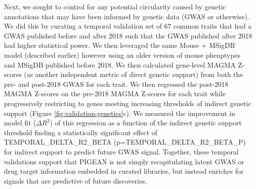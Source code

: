 Next, we sought to control for any potential circularity caused by genetic annotations that may have been informed by genetic data (GWAS or otherwise). We did this by curating a temporal validation set of 67 common traits that had a GWAS published before and after 2018 such that the GWAS published after 2018 had higher statistical power. We then leveraged the same Mouse + MSigDB model (described earlier) however using an older version of mouse phenptypes and MSigDB published before 2018. We then calculated gene-level MAGMA \cite{} Z-scores (as another independent metric of direct genetic support) from both the pre- and post-2018 GWAS for each trait. We then regressed the post-2018 MAGMA Z-scores on the pre-2018 MAGMA Z-scores for each trait while progressively restricting to genes meeting increasing thresholds of indirect genetic support (Figure \ref{fig:validation-genetics}c). We measured the improvement in model fit ($\Delta R^2$) of this regression as a function of the indirect genetic support threshold finding a statistically significant effect of {{TEMPORAL_DELTA_R2_BETA}} (p={{TEMPORAL_DELTA_R2_BETA_P}}) for indirect support to predict future GWAS signal. Together, these temporal validations support that PIGEAN is not simply recapitulating latent GWAS or drug target information embedded in curated libraries, but instead enriches for signals that are predictive of future discoveries. 



